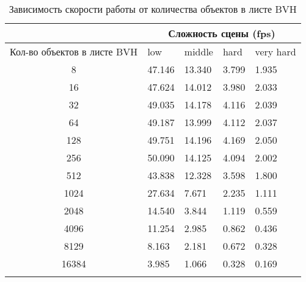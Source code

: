\begin{center}
\begin{longtable}{|c|p{2cm}|p{2cm}|p{2cm}|p{2cm}|}
\hline & \multicolumn{4}{c|}{Сложность сцены (fps)} \\ 
\hline Кол-во объектов в листе BVH & low & middle & hard &  very hard\\ 
\hline 8 &  47.146 & 13.340 & 3.799 & 1.935 \\ 
\hline 16 &  47.624 & 14.012 & 3.980 & 2.033 \\ 
\hline 32 &  49.035 & 14.178 & 4.116 & 2.039 \\ 
\hline 64 &  49.187 & 13.999 & 4.112 & 2.037 \\ 
\hline 128 &  49.751 & 14.196 & 4.169 & 2.050 \\ 
\hline 256 &  50.090 & 14.125 & 4.094 & 2.002 \\ 
\hline 512 &  43.838 & 12.328 & 3.598 & 1.800 \\ 
\hline 1024 &  27.634 & 7.671 & 2.235 & 1.111 \\ 
\hline 2048 &  14.540 & 3.844 & 1.119 & 0.559 \\ 
\hline 4096 &  11.254 & 2.985 & 0.862 & 0.436 \\ 
\hline 8129 &  8.163 & 2.181 & 0.672 & 0.328 \\ 
\hline 16384 &  3.985 & 1.066 & 0.328 & 0.169 \\ 
\hline
\caption{Зависимость скорости работы от количества объектов в листе BVH}\label{tab:performance_bvh}\end{longtable}
\end{center}

